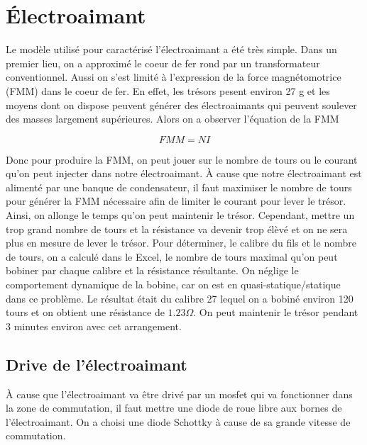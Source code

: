 \section{Électroaimant}
Le modèle utilisé pour caractérisé l'électroaimant a été très simple. Dans un premier lieu, on a approximé le coeur de fer rond par un transformateur conventionnel. Aussi on s'est limité à l'expression de la force magnétomotrice (FMM) dans le coeur de fer. En effet, les trésors pesent environ 27 g et les moyens dont on dispose peuvent générer des électroaimants qui peuvent soulever des masses largement supérieures. Alors on a observer l'équation de la FMM

\begin{equation}
FMM = NI
\end{equation}

Donc pour produire la FMM, on peut jouer sur le nombre de tours ou le courant qu'on peut injecter dans notre électroaimant. À cause que notre électroaimant est alimenté par une banque de condensateur, il faut maximiser le nombre de tours pour générer la FMM nécessaire afin de limiter le courant pour lever le trésor. Ainsi, on allonge le temps qu'on peut maintenir le trésor. Cependant, mettre un trop grand nombre de tours et la résistance va devenir trop élèvé et on ne sera plus en mesure de lever le trésor. Pour déterminer, le calibre du fils et le nombre de tours, on a calculé dans le Excel, le nombre de tours maximal qu'on peut bobiner par chaque calibre et la résistance résultante. On néglige le comportement dynamique de la bobine, car on est en quasi-statique/statique dans ce problème. Le résultat était du calibre 27 lequel on a bobiné environ 120 tours et on obtient une résistance de $1.23 \Omega$. On peut maintenir le trésor pendant 3 minutes environ avec cet arrangement.

\subsection{Drive de l'électroaimant}

À cause que l'électroaimant va être drivé par un mosfet qui va fonctionner dans la zone de commutation, il faut mettre une diode de roue libre aux bornes de l'électroaimant. On a choisi une diode Schottky à cause de sa grande vitesse de commutation.

